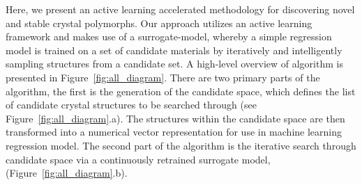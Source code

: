 %
%
%
%
%



%
%
Here, we present an active learning accelerated methodology for discovering novel and stable crystal polymorphs.
%
Our approach utilizes an active learning framework and makes use of a surrogate-model,
whereby a simple regression model is trained on a set of candidate materials by iteratively and intelligently sampling structures from a candidate set.
%
A high-level overview of algorithm is presented in Figure~\ref{fig:all_diagram}.
%
There are two primary parts of the algorithm, the first is the generation of the candidate space,
which defines the list of candidate crystal structures to be searched through (see Figure~\ref{fig:all_diagram}.a).
%
The structures within the candidate space are then transformed into a numerical vector representation for use in machine learning regression model.
%
The second part of the algorithm is the iterative search through candidate space via a continuously retrained surrogate model, (Figure~\ref{fig:all_diagram}.b).



